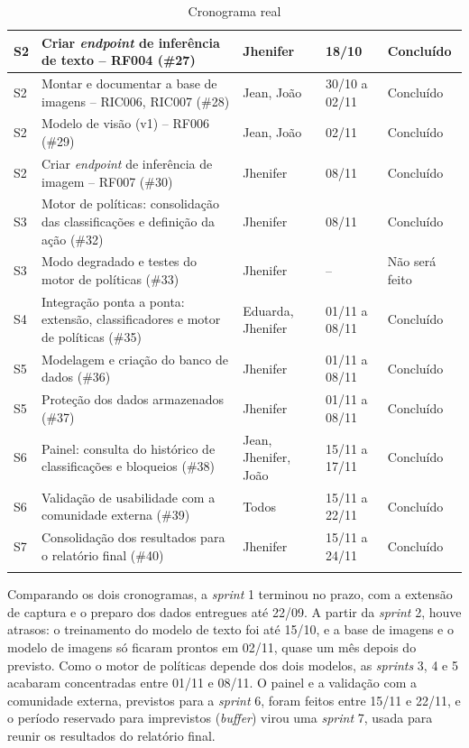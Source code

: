 \documentclass[
    12pt,           %
    oneside,        %
    a4paper,        %
    chapter=TITLE,  %
    english,        %
    brazil          %
]{abntex2}
\begin{document}
{\begin{longtable}{|p{1.3cm}|p{6.4cm}|p{2.6cm}|p{2.0cm}|p{1.5cm}|}
S2 & Criar \textit{endpoint} de inferência de texto -- RF004 (\#27) & Jhenifer & 18/10 & Concluído \\ \hline
S2 & Montar e documentar a base de imagens -- RIC006, RIC007 (\#28) & Jean, João & 30/10 a 02/11 & Concluído \\ \hline
S2 & Modelo de visão (v1) -- RF006 (\#29) & Jean, João & 02/11 & Concluído \\ \hline
S2 & Criar \textit{endpoint} de inferência de imagem -- RF007 (\#30) & Jhenifer & 08/11 & Concluído \\ \hline
S3 & Motor de políticas: consolidação das classificações e definição da ação (\#32) & Jhenifer & 08/11 & Concluído \\ \hline
S3 & Modo degradado e testes do motor de políticas (\#33) & Jhenifer & -- & Não será feito \\ \hline
S4 & Integração ponta a ponta: extensão, classificadores e motor de políticas (\#35) & Eduarda, Jhenifer & 01/11 a 08/11 & Concluído \\ \hline
S5 & Modelagem e criação do banco de dados (\#36) & Jhenifer & 01/11 a 08/11 & Concluído \\ \hline
S5 & Proteção dos dados armazenados (\#37) & Jhenifer & 01/11 a 08/11 & Concluído \\ \hline
S6 & Painel: consulta do histórico de classificações e bloqueios (\#38) & Jean, Jhenifer, João & 15/11 a 17/11 & Concluído \\ \hline
S6 & Validação de usabilidade com a comunidade externa (\#39) & Todos & 15/11 a 22/11 & Concluído \\ \hline
S7 & Consolidação dos resultados para o relatório final (\#40) & Jhenifer & 15/11 a 24/11 & Concluído \\ \hline
\caption{Cronograma real}
\label{tab:cronograma-real}
\end{longtable}
}

Comparando os dois cronogramas, a \textit{sprint} 1 terminou no prazo, com a
extensão de captura e o preparo dos dados entregues até 22/09. A partir da
\textit{sprint} 2, houve atrasos: o treinamento do modelo de texto foi até
15/10, e a base de imagens e o modelo de imagens só ficaram prontos em 02/11,
quase um mês depois do previsto. Como o motor de políticas depende dos dois
modelos, as \textit{sprints} 3, 4 e 5 acabaram concentradas entre 01/11 e
08/11. O painel e a validação com a comunidade externa, previstos para a
\textit{sprint} 6, foram feitos entre 15/11 e 22/11, e o período reservado
para imprevistos (\textit{buffer}) virou uma \textit{sprint} 7, usada para
reunir os resultados do relatório final.
\end{document}
